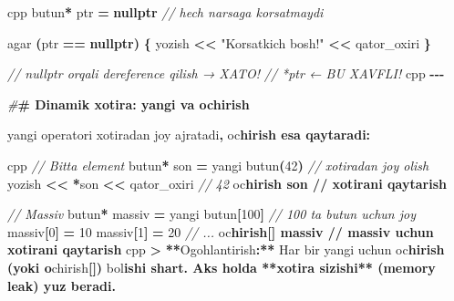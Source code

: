 \documentclass[a4paper,11pt,twoside,openright]{book}
\newenvironment{Shaded}{\begin{snugshade}}{\end{snugshade}}
\newcommand{\CharTok}[1]{\textcolor[rgb]{0.31,0.60,0.02}{#1}}
\newcommand{\CommentTok}[1]{\textcolor[rgb]{0.56,0.35,0.01}{\textit{#1}}}
\newcommand{\DecValTok}[1]{\textcolor[rgb]{0.00,0.00,0.81}{#1}}
\newcommand{\ErrorTok}[1]{\textcolor[rgb]{0.64,0.00,0.00}{\textbf{#1}}}
\newcommand{\KeywordTok}[1]{\textcolor[rgb]{0.13,0.29,0.53}{\textbf{#1}}}
\newcommand{\NormalTok}[1]{#1}
\newcommand{\OperatorTok}[1]{\textcolor[rgb]{0.81,0.36,0.00}{\textbf{#1}}}
\newcommand{\PreprocessorTok}[1]{\textcolor[rgb]{0.56,0.35,0.01}{\textit{#1}}}
\newcommand{\StringTok}[1]{\textcolor[rgb]{0.31,0.60,0.02}{#1}}
\begin{document}
\begin{Shaded}
\begin{Highlighting}[]
\ErrorTok{\textasciigrave{}\textasciigrave{}\textasciigrave{}}\NormalTok{cpp}
\NormalTok{butun}\OperatorTok{*}\NormalTok{ ptr }\OperatorTok{=} \KeywordTok{nullptr}     \CommentTok{// hech narsaga ko\textquotesingle{}rsatmaydi}

\NormalTok{agar }\OperatorTok{(}\NormalTok{ptr }\OperatorTok{==} \KeywordTok{nullptr}\OperatorTok{)} \OperatorTok{\{}
\NormalTok{    yozish }\OperatorTok{\textless{}\textless{}} \StringTok{"Ko\textquotesingle{}rsatkich bo\textquotesingle{}sh!"} \OperatorTok{\textless{}\textless{}}\NormalTok{ qator\_oxiri}
\OperatorTok{\}}

\CommentTok{// nullptr orqali dereference qilish → XATO!}
\CommentTok{// *ptr    ← BU XAVFLI!}
\ErrorTok{\textasciigrave{}\textasciigrave{}\textasciigrave{}}\NormalTok{cpp}
\OperatorTok{{-}{-}{-}}

\PreprocessorTok{\#}\ErrorTok{\# Dinamik xotira: \textasciigrave{}yangi\textasciigrave{} va \textasciigrave{}o\textquotesingle{}chirish\textasciigrave{}}

\ErrorTok{\textasciigrave{}}\NormalTok{yangi}\ErrorTok{\textasciigrave{}}\NormalTok{ operatori xotiradan joy ajratadi}\OperatorTok{,} \ErrorTok{\textasciigrave{}}\NormalTok{o}\CharTok{\textquotesingle{}c}\ErrorTok{hirish\textasciigrave{} esa qaytaradi:}

\ErrorTok{\textasciigrave{}\textasciigrave{}\textasciigrave{}}\NormalTok{cpp}
\CommentTok{// Bitta element}
\NormalTok{butun}\OperatorTok{*}\NormalTok{ son }\OperatorTok{=}\NormalTok{ yangi butun}\OperatorTok{(}\DecValTok{42}\OperatorTok{)}       \CommentTok{// xotiradan joy olish}
\NormalTok{yozish }\OperatorTok{\textless{}\textless{}} \OperatorTok{*}\NormalTok{son }\OperatorTok{\textless{}\textless{}}\NormalTok{ qator\_oxiri     }\CommentTok{// 42}
\NormalTok{o}\CharTok{\textquotesingle{}c}\ErrorTok{hirish son                       // xotirani qaytarish}

\CommentTok{// Massiv}
\NormalTok{butun}\OperatorTok{*}\NormalTok{ massiv }\OperatorTok{=}\NormalTok{ yangi butun}\OperatorTok{[}\DecValTok{100}\OperatorTok{]}   \CommentTok{// 100 ta butun uchun joy}
\NormalTok{massiv}\OperatorTok{[}\DecValTok{0}\OperatorTok{]} \OperatorTok{=} \DecValTok{10}
\NormalTok{massiv}\OperatorTok{[}\DecValTok{1}\OperatorTok{]} \OperatorTok{=} \DecValTok{20}
\CommentTok{// ...}
\NormalTok{o}\CharTok{\textquotesingle{}c}\ErrorTok{hirish[] massiv                  // massiv uchun xotirani qaytarish}
\ErrorTok{\textasciigrave{}\textasciigrave{}\textasciigrave{}}\NormalTok{cpp}
\OperatorTok{\textgreater{}} \OperatorTok{**}\NormalTok{Ogohlantirish}\OperatorTok{:**}\NormalTok{ Har bir }\ErrorTok{\textasciigrave{}}\NormalTok{yangi}\ErrorTok{\textasciigrave{}}\NormalTok{ uchun }\ErrorTok{\textasciigrave{}}\NormalTok{o}\CharTok{\textquotesingle{}c}\ErrorTok{hirish\textasciigrave{} (yoki \textasciigrave{}o}\CharTok{\textquotesingle{}}\NormalTok{chirish}\OperatorTok{[]}\ErrorTok{\textasciigrave{}}\OperatorTok{)}\NormalTok{ bo}\CharTok{\textquotesingle{}l}\ErrorTok{ishi shart. Aks holda **xotira sizishi** (memory leak) yuz beradi.}


\end{Highlighting}
\end{Shaded}
\end{document}
